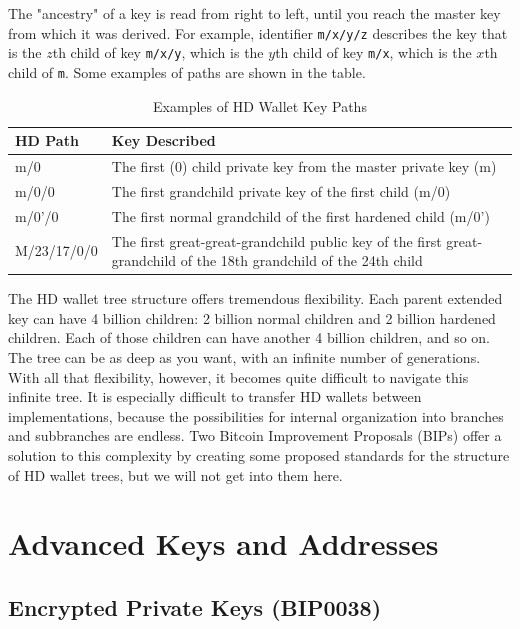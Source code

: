 \documentclass{article}
\begin{document}
    The "ancestry" of a key is read from right to left, until you reach the master key from which it was derived. For example, identifier \texttt{m/x/y/z} describes the key that is the $z$th child of key \texttt{m/x/y}, which is the $y$th child of key \texttt{m/x}, which is the $x$th child of \texttt{m}. Some examples of paths are shown in the table.

    \begin{table}[H]
    \centering
    \begin{tabular}{|l|l|}
    \hline
    \textbf{HD Path} & \textbf{Key Described} \\
    \hline
    m/0 & The first (0) child private key from the master private key (m) \\
    m/0/0 & The first grandchild private key of the first child (m/0) \\
    m/0'/0 & The first normal grandchild of the first hardened child (m/0') \\
    M/23/17/0/0 & The first great-great-grandchild public key of the first great-grandchild of the 18th grandchild of the 24th child \\
    \hline
    \end{tabular}
    \caption{Examples of HD Wallet Key Paths}
    \end{table}

    The HD wallet tree structure offers tremendous flexibility. Each parent extended key can have 4 billion children: 2 billion normal children and 2 billion hardened children. Each of those children can have another 4 billion children, and so on. The tree can be as deep as you want, with an infinite number of generations. With all that flexibility, however, it becomes quite difficult to navigate this infinite tree. It is especially difficult to transfer HD wallets between implementations, because the possibilities for internal organization into branches and subbranches are endless. Two Bitcoin Improvement Proposals (BIPs) offer a solution to this complexity by creating some proposed standards for the structure of HD wallet trees, but we will not get into them here.

\section{Advanced Keys and Addresses}

  \subsection{Encrypted Private Keys (BIP0038)}
\end{document}
